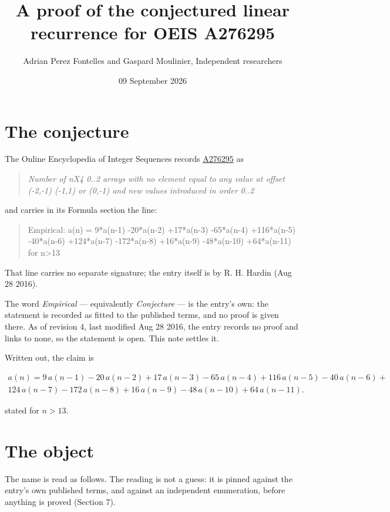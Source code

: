 \documentclass[11pt]{article}
\title{A proof of the conjectured linear recurrence for OEIS A276295}
\author{Adrian Perez Fontelles and Gaspard Moulinier, Independent researchers}
\date{09 September 2026}
\theoremstyle{definition}
\begin{document}
\maketitle
\section{The conjecture}

The Online Encyclopedia of Integer Sequences records \href{https://oeis.org/A276295}{A276295} as

\begin{quote}\itshape Number of nX4 0..2 arrays with no element equal to any value at offset (-2,-1) (-1,1) or (0,-1) and new values introduced in order 0..2\end{quote}

and carries in its Formula section the line:

\begin{quote}\ttfamily Empirical: a(n) = 9*a(n-1) -20*a(n-2) +17*a(n-3) -65*a(n-4) +116*a(n-5) -40*a(n-6) +124*a(n-7) -172*a(n-8) +16*a(n-9) -48*a(n-10) +64*a(n-11) for n>13\end{quote}

That line carries no separate signature; the entry itself is by R. H. Hardin (Aug 28 2016).

The word {\itshape Empirical} --- equivalently {\itshape Conjecture} --- is the entry's own: the statement is recorded as fitted to the published terms, and no proof is given there. As of revision 4, last modified Aug 28 2016, the entry records no proof and links to none, so the statement is open. This note settles it.

Written out, the claim is

\begin{multline*} a(n) = 9\,a(n-1) - 20\,a(n-2) + 17\,a(n-3) - 65\,a(n-4) + 116\,a(n-5) - 40\,a(n-6) + \\ 124\,a(n-7) - 172\,a(n-8) + 16\,a(n-9) - 48\,a(n-10) + 64\,a(n-11). \end{multline*}

stated for $n > 13$.

\section{The object}

The name is read as follows. The reading is not a guess: it is pinned against the entry's own published terms, and against an independent enumeration, before anything is proved (Section 7).
\end{document}
